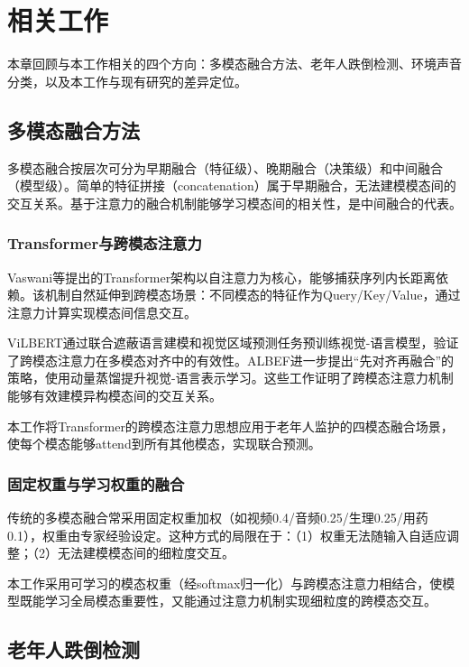 \chapter{相关工作}
\label{chap:related}

本章回顾与本工作相关的四个方向：多模态融合方法、老年人跌倒检测、环境声音分类，以及本工作与现有研究的差异定位。

\section{多模态融合方法}

多模态融合按层次可分为早期融合（特征级）、晚期融合（决策级）和中间融合（模型级）\cite{baltrusaitis2019multimodal}。简单的特征拼接（concatenation）属于早期融合，无法建模模态间的交互关系。基于注意力的融合机制能够学习模态间的相关性，是中间融合的代表。

\subsection{Transformer与跨模态注意力}

Vaswani等\cite{vaswani2017attention}提出的Transformer架构以自注意力为核心，能够捕获序列内长距离依赖。该机制自然延伸到跨模态场景：不同模态的特征作为Query/Key/Value，通过注意力计算实现模态间信息交互。

ViLBERT\cite{lu2019vilbert}通过联合遮蔽语言建模和视觉区域预测任务预训练视觉-语言模型，验证了跨模态注意力在多模态对齐中的有效性。ALBEF\cite{li2021align}进一步提出``先对齐再融合''的策略，使用动量蒸馏提升视觉-语言表示学习。这些工作证明了跨模态注意力机制能够有效建模异构模态间的交互关系。

本工作将Transformer的跨模态注意力思想应用于老年人监护的四模态融合场景，使每个模态能够attend到所有其他模态，实现联合预测。

\subsection{固定权重与学习权重的融合}

传统的多模态融合常采用固定权重加权（如视频0.4/音频0.25/生理0.25/用药0.1），权重由专家经验设定。这种方式的局限在于：（1）权重无法随输入自适应调整；（2）无法建模模态间的细粒度交互。

本工作采用可学习的模态权重（经softmax归一化）与跨模态注意力相结合，使模型既能学习全局模态重要性，又能通过注意力机制实现细粒度的跨模态交互。

\section{老年人跌倒检测}

